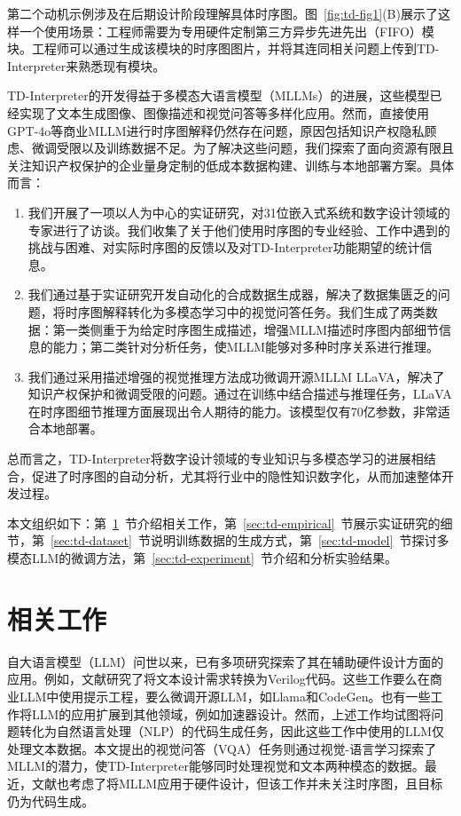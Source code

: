 第二个动机示例涉及在后期设计阶段理解具体时序图。图~\ref{fig:td-fig1}(B)展示了这样一个使用场景：工程师需要为专用硬件定制第三方异步先进先出（FIFO）模块。工程师可以通过生成该模块的时序图图片，并将其连同相关问题上传到TD-Interpreter来熟悉现有模块。

TD-Interpreter的开发得益于多模态大语言模型（MLLMs）的进展，这些模型已经实现了文本生成图像、图像描述和视觉问答等多样化应用。然而，直接使用GPT-4o等商业MLLM进行时序图解释仍然存在问题，原因包括知识产权隐私顾虑、微调受限以及训练数据不足。为了解决这些问题，我们探索了面向资源有限且关注知识产权保护的企业量身定制的低成本数据构建、训练与本地部署方案。具体而言：

\begin{enumerate}
  \item 我们开展了一项以人为中心的实证研究，对31位嵌入式系统和数字设计领域的专家进行了访谈。我们收集了关于他们使用时序图的专业经验、工作中遇到的挑战与困难、对实际时序图的反馈以及对TD-Interpreter功能期望的统计信息。
  \item 我们通过基于实证研究开发自动化的合成数据生成器，解决了数据集匮乏的问题，将时序图解释转化为多模态学习中的视觉问答任务。我们生成了两类数据：第一类侧重于为给定时序图生成描述，增强MLLM描述时序图内部细节信息的能力；第二类针对分析任务，使MLLM能够对多种时序关系进行推理。
  \item 我们通过采用描述增强的视觉推理方法成功微调开源MLLM LLaVA，解决了知识产权保护和微调受限的问题。通过在训练中结合描述与推理任务，LLaVA在时序图细节推理方面展现出令人期待的能力。该模型仅有70亿参数，非常适合本地部署。
\end{enumerate}

总而言之，TD-Interpreter将数字设计领域的专业知识与多模态学习的进展相结合，促进了时序图的自动分析，尤其将行业中的隐性知识数字化，从而加速整体开发过程。

本文组织如下：第~\ref{sec:td-related}~节介绍相关工作，第~\ref{sec:td-empirical}~节展示实证研究的细节，第~\ref{sec:td-dataset}~节说明训练数据的生成方式，第~\ref{sec:td-model}~节探讨多模态LLM的微调方法，第~\ref{sec:td-experiment}~节介绍和分析实验结果。


\section{相关工作}\label{sec:td-related}

自大语言模型（LLM）问世以来，已有多项研究探索了其在辅助硬件设计方面的应用。例如，文献研究了将文本设计需求转换为Verilog代码。这些工作要么在商业LLM中使用提示工程，要么微调开源LLM，如Llama和CodeGen。也有一些工作将LLM的应用扩展到其他领域，例如加速器设计。然而，上述工作均试图将问题转化为自然语言处理（NLP）的代码生成任务，因此这些工作中使用的LLM仅处理文本数据。本文提出的视觉问答（VQA）任务则通过视觉-语言学习探索了MLLM的潜力，使TD-Interpreter能够同时处理视觉和文本两种模态的数据。最近，文献也考虑了将MLLM应用于硬件设计，但该工作并未关注时序图，且目标仍为代码生成。

